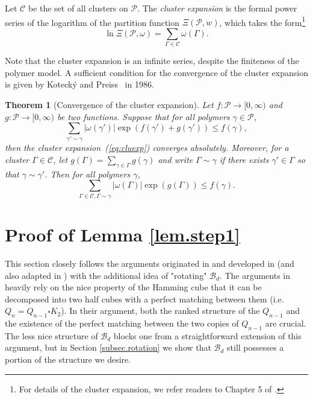 \documentclass{amsart}
\newtheorem{thm}{Theorem}[section]
\theoremstyle{definition}
\newcommand{\we}{\omega}
\newcommand{\cB}{\mathcal{B} }
\newcommand{\cC}{\mathcal{C} }
\newcommand{\cP}{\mathcal{P} }
\newcommand{\0}[0]{\emptyset}
\begin{document}
Let $\mathcal{C}$ be the set of all clusters on $\cP$. The \textit{cluster expansion} is the formal power series of the logarithm
of the partition function $\Xi(\cP, w)$, which takes the form\footnote{For details of the cluster expansion, we refer  readers to Chapter 5 of \cite{friedli2017statistical}.}
\begin{equation}\label{eq:cluexp}
 \ln\Xi(\cP, \we) = \sum_{\Gamma\in\mathcal{C}}\we(\Gamma). 
\end{equation}

Note that the cluster expansion is an infinite series, despite the finiteness of the polymer model.
A sufficient condition for the convergence of the cluster expansion is given by Koteck\'{y} and Preiss~\cite{kotecky1986cluster} in 1986.

\begin{thm}[Convergence of the cluster expansion]\label{KPconv}
Let $f: \cP \rightarrow [0, \infty)$ and $g: \cP \rightarrow [0, \infty)$ be two functions. Suppose that for all polymers $\gamma\in\cP$,
\begin{equation}\label{eq:kot-thm1}
\sum_{\gamma'\sim \gamma}|\we(\gamma')|\exp\left(f(\gamma')+g(\gamma')\right)\leq f(\gamma),
\end{equation}
then the cluster expansion~(\ref{eq:cluexp}) converges absolutely. 
Moreover, for a cluster $\Gamma\in \cC$, let $g(\Gamma)=\sum_{\gamma\in\Gamma}g(\gamma)$ and write $\Gamma\sim \gamma$ if there exists $\gamma'\in \Gamma$ so that $\gamma\sim \gamma'$. Then for all polymers $\gamma$,
\begin{equation}\label{eq:kot-thm2}
\sum_{\Gamma\in \mathcal{C}, \Gamma\sim \gamma}|\we(\Gamma)|\exp\left(g(\Gamma)\right)\leq f(\gamma).
\end{equation}
\end{thm}


\section{Proof of Lemma \ref{lem.step1}}\label{sec.step1}

This section closely follows the arguments originated in \cite{Kahn} and developed in \cite{EG} (and also adapted in \cite{JK}) with the additional idea of "rotating" $\cB_d$. The arguments in \cite{Kahn,EG} heavily rely on the nice property of the Hamming cube that it can be decomposed into two half cubes with a perfect matching between them (i.e. $Q_n=Q_{n-1} \square K_2$). In their argument, both the ranked structure of the $Q_{n-1}$ and the existence of the perfect matching between the two copies of $Q_{n-1}$ are crucial. The less nice structure of $\cB_d$ blocks one from a straightforward extension of this argument, but in Section \ref{subsec.rotation} we show that $\cB_d$ still possesses a portion of the structure we desire.
	
\end{document}
